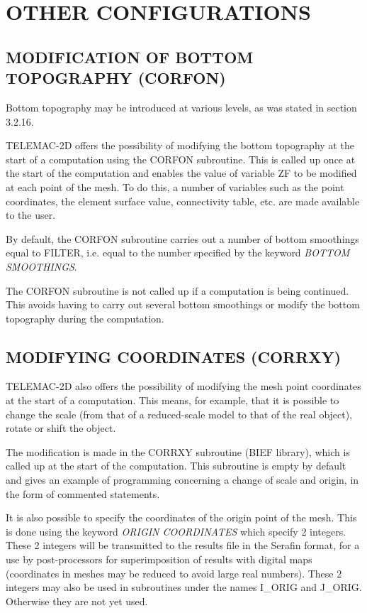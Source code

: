 

\chapter{  OTHER CONFIGURATIONS}


\section{ MODIFICATION OF BOTTOM TOPOGRAPHY (CORFON)}

 Bottom topography may be introduced at various levels, as was stated in section 3.2.16.

 TELEMAC-2D offers the possibility of modifying the bottom topography at the start of a computation using the CORFON subroutine. This is called up once at the start of the computation and enables the value of variable ZF to be modified at each point of the mesh. To do this, a number of variables such as the point coordinates, the element surface value, connectivity table, etc. are made available to the user.

 By default, the CORFON subroutine carries out a number of bottom smoothings equal to FILTER, i.e. equal to the number specified by the keyword \textit{BOTTOM SMOOTHINGS}.

 The CORFON subroutine is not called up if a computation is being continued. This avoids having to carry out several bottom smoothings or modify the bottom topography during the computation.


\section{ MODIFYING COORDINATES (CORRXY)}

 TELEMAC-2D also offers the possibility of modifying the mesh point coordinates at the start of a computation. This means, for example, that it is possible to change the scale (from that of a reduced-scale model to that of the real object), rotate or shift the object.

 The modification is made in the CORRXY subroutine (BIEF library), which is called up at the start of the computation. This subroutine is empty by default and gives an example of programming concerning a change of scale and origin, in the form of commented statements.

 It is also possible to specify the coordinates of the origin point of the mesh. This is done using the keyword \textit{ORIGIN COORDINATES} which specify 2 integers. These 2 integers will be transmitted to the results file in the Serafin format, for a use by post-processors for superimposition of results with digital maps (coordinates in meshes may be reduced to avoid large real numbers). These 2 integers may also be used in subroutines under the names I\_ORIG and J\_ORIG. Otherwise they are not yet used.


